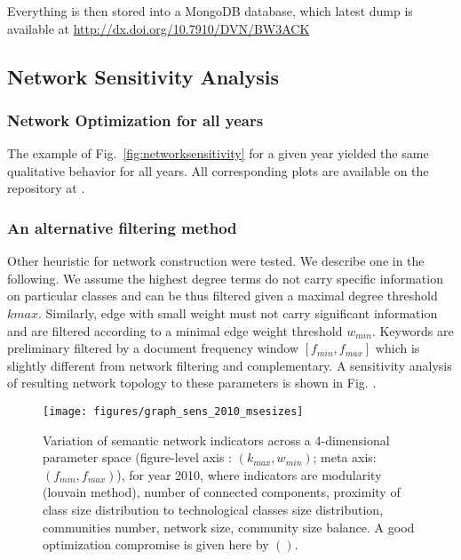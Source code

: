 \documentclass[10pt,A4]{article}
\begin{document}
Everything is then stored into a MongoDB database, which latest dump is available at \url{http://dx.doi.org/10.7910/DVN/BW3ACK} %




\subsection*{Network Sensitivity Analysis \label{app:sensitivity}}




\subsubsection*{Network Optimization for all years}



The example of Fig.~\ref{fig:networksensitivity} for a given year yielded the same qualitative behavior for all years. All corresponding plots are available on the repository at \texttt{}.




\subsubsection*{An alternative filtering method}

Other heuristic for network construction were tested. We describe one in the following. We assume the highest degree terms do not carry specific information on particular classes and can be thus filtered given a maximal degree threshold $k{max}$. Similarly, edge with small weight must not carry significant information and are filtered according to a minimal edge weight threshold $w_{min}$. Keywords are preliminary filtered by a document frequency window $\left[ f_{min},f_{max} \right]$ which is slightly different from network filtering and complementary. A sensitivity analysis of resulting network topology to these parameters is shown in Fig. .


\begin{figure}[!ht]
\texttt{[image: figures/graph\_sens\_2010\_msesizes]}
\caption{Variation of semantic network indicators across a 4-dimensional parameter space (figure-level axis : $(k_{max},w_{min})$; meta axis: $(f_{min},f_{max})$), for year 2010, where indicators are modularity (louvain method), number of connected components, proximity of class size distribution to technological classes size distribution, communities number, network size, community size balance. A good optimization compromise is given here by $()$.}
\end{figure}
\end{document}
